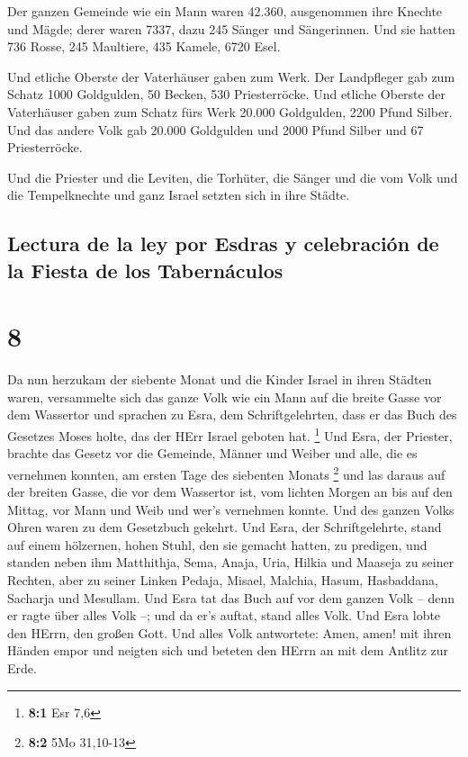  Der ganzen Gemeinde wie ein Mann waren 42.360,
 ausgenommen ihre Knechte und Mägde; derer waren 7337,
dazu 245 Sänger und Sängerinnen.  Und sie hatten 736
Rosse, 245 Maultiere,  435 Kamele, 6720 Esel.

 Und etliche Oberste der Vaterhäuser gaben zum Werk. Der
Landpfleger gab zum Schatz 1000 Goldgulden, 50 Becken, 530
Priesterröcke.  Und etliche Oberste der Vaterhäuser gaben
zum Schatz fürs Werk 20.000 Goldgulden, 2200 Pfund Silber.
 Und das andere Volk gab 20.000 Goldgulden und 2000 Pfund
Silber und 67 Priesterröcke.

 Und die Priester und die Leviten, die Torhüter, die
Sänger und die vom Volk und die Tempelknechte und ganz Israel setzten
sich in ihre Städte.

\hypertarget{lectura-de-la-ley-por-esdras-y-celebraciuxf3n-de-la-fiesta-de-los-tabernuxe1culos}{%
\subsection{Lectura de la ley por Esdras y celebración de la Fiesta de
los
Tabernáculos}\label{lectura-de-la-ley-por-esdras-y-celebraciuxf3n-de-la-fiesta-de-los-tabernuxe1culos}}

\hypertarget{section-7}{%
\section{8}\label{section-7}}

 Da nun herzukam der siebente Monat und die Kinder Israel
in ihren Städten waren, versammelte sich das ganze Volk wie ein Mann auf
die breite Gasse vor dem Wassertor und sprachen zu Esra, dem
Schriftgelehrten, dass er das Buch des Gesetzes Moses holte, das der
HErr Israel geboten hat. \footnote{\textbf{8:1} Esr 7,6} 
Und Esra, der Priester, brachte das Gesetz vor die Gemeinde, Männer und
Weiber und alle, die es vernehmen konnten, am ersten Tage des siebenten
Monats \footnote{\textbf{8:2} 5Mo 31,10-13}  und las
daraus auf der breiten Gasse, die vor dem Wassertor ist, vom lichten
Morgen an bis auf den Mittag, vor Mann und Weib und wer's vernehmen
konnte. Und des ganzen Volks Ohren waren zu dem Gesetzbuch gekehrt.
 Und Esra, der Schriftgelehrte, stand auf einem hölzernen,
hohen Stuhl, den sie gemacht hatten, zu predigen, und standen neben ihm
Matthithja, Sema, Anaja, Uria, Hilkia und Maaseja zu seiner Rechten,
aber zu seiner Linken Pedaja, Misael, Malchia, Hasum, Hasbaddana,
Sacharja und Mesullam.  Und Esra tat das Buch auf vor dem
ganzen Volk -- denn er ragte über alles Volk --; und da er's auftat,
stand alles Volk.  Und Esra lobte den HErrn, den großen
Gott. Und alles Volk antwortete: Amen, amen! mit ihren Händen empor und
neigten sich und beteten den HErrn an mit dem Antlitz zur Erde.

